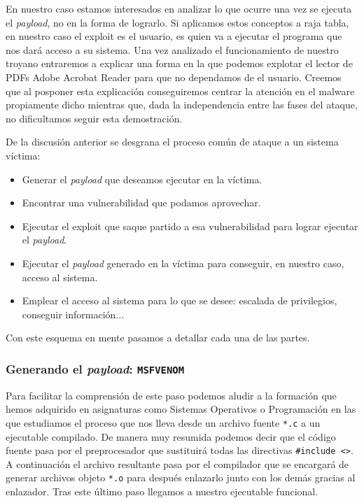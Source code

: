 \documentclass[12pt]{article}
\newcommand{\newpar} {
    \vskip 0.5cm
}
\begin{document}
                \newpar

                En nuestro caso estamos interesados en analizar lo que ocurre una vez se ejecuta el \textit{payload}, no en la forma de lograrlo. Si aplicamos estos conceptos a raja tabla, en nuestro caso el exploit es el usuario, es quien va a ejecutar el programa que nos dará acceso a su sistema. Una vez analizado el funcionamiento de nuestro troyano entraremos a explicar una forma en la que podemos explotar el lector de PDFs Adobe Acrobat Reader para que no dependamos de el usuario. Creemos que al posponer esta explicación conseguiremos centrar la atención en el malware propiamente dicho mientras que, dada la independencia entre las fases del ataque, no dificultamos seguir esta demostración.

                \newpar

                De la discusión anterior se desgrana el proceso común de ataque a un sistema víctima:

                \begin{itemize}
                    \item Generar el \textit{payload} que deseamos ejecutar en la víctima.
                    \item Encontrar una vulnerabilidad que podamos aprovechar.
                    \item Ejecutar el exploit que saque partido a esa vulnerabilidad para lograr ejecutar el \textit{payload}.
                    \item Ejecutar el \textit{payload} generado en la víctima para conseguir, en nuestro caso, acceso al sistema.
                    \item Emplear el acceso al sistema para lo que se desee: escalada de privilegios, conseguir información...
                \end{itemize}


                Con este esquema en mente pasamos a detallar cada una de las partes.

            \subsubsection{Generando el \textit{payload}: \texttt{MSFVENOM}}
                Para facilitar la comprensión de este paso podemos aludir a la formación que hemos adquirido en asignaturas como Sistemas Operativos o Programación en las que estudiamos el proceso que nos lleva desde un archivo fuente \texttt{*.c} a un ejecutable compilado. De manera muy resumida podemos decir que el código fuente pasa por el preprocesador que sustituirá todas las directivas \texttt{\#include <>}. A continuación el archivo resultante pasa por el compilador que se encargará de generar archivos objeto \texttt{*.o} para después enlazarlo junto con los demás gracias al enlazador. Tras este último paso llegamos a nuestro ejecutable funcional.
\end{document}
